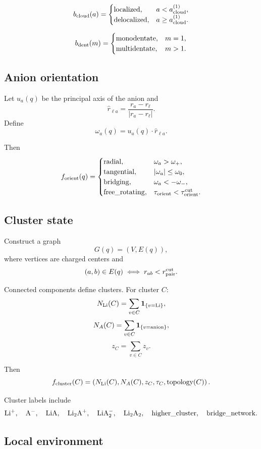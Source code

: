 \[
b_{\rm cloud}(a)=
\begin{cases}
{\rm localized}, & a<a_{\rm cloud}^{(1)},\\
{\rm delocalized}, & a\ge a_{\rm cloud}^{(1)}.
\end{cases}
\]

\[
b_{\rm dent}(m)=
\begin{cases}
{\rm monodentate}, & m=1,\\
{\rm multidentate}, & m>1.
\end{cases}
\]

\subsection{Anion orientation}

Let \(u_a(q)\) be the principal axis of the anion and
\[
\hat r_{\ell a}=\frac{r_a-r_\ell}{|r_a-r_\ell|}.
\]
Define
\[
\omega_a(q)=u_a(q)\cdot \hat r_{\ell a}.
\]

Then
\[
f_{\rm orient}(q)=
\begin{cases}
{\rm radial}, & \omega_a>\omega_+,\\
{\rm tangential}, & |\omega_a|\le\omega_0,\\
{\rm bridging}, & \omega_a<-\omega_-,\\
{\rm free\_rotating}, & \tau_{\rm orient}<\tau_{\rm orient}^{\rm cut}.
\end{cases}
\]

\subsection{Cluster state}

Construct a graph
\[
G(q)=(V,E(q)),
\]
where vertices are charged centers and
\[
(a,b)\in E(q)
\iff
r_{ab}<r_{\rm pair}^{\rm cut}.
\]

Connected components define clusters. For cluster \(C\):
\[
N_{\rm Li}(C)=\sum_{v\in C}\mathbf 1_{\{v={\rm Li}\}},
\]
\[
N_A(C)=\sum_{v\in C}\mathbf 1_{\{v={\rm anion}\}},
\]
\[
z_C=\sum_{v\in C}z_v.
\]

Then
\[
f_{\rm cluster}(C)=
\left(N_{\rm Li}(C),N_A(C),z_C,\tau_C,\text{topology}(C)\right).
\]

Cluster labels include
\[
{\rm Li^+},\quad
{\rm A^-},\quad
{\rm LiA},\quad
{\rm Li_2A^+},\quad
{\rm LiA_2^-},\quad
{\rm Li_2A_2},\quad
{\rm higher\_cluster},\quad
{\rm bridge\_network}.
\]

\subsection{Local environment}


